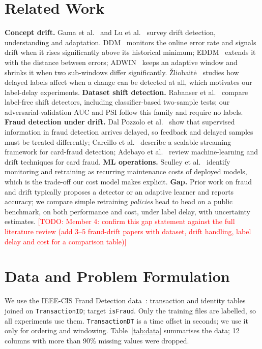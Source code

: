 \documentclass[conference]{IEEEtran}
\newcommand{\todo}[1]{\textcolor{red}{[TODO: #1]}}
\begin{document}
\section{Related Work}
\textbf{Concept drift.} Gama et al.~\cite{gama2014survey} and Lu et al.~\cite{lu2019review} survey drift detection, understanding and adaptation.
DDM~\cite{gama2004ddm} monitors the online error rate and signals drift when it rises significantly above its historical minimum;
EDDM~\cite{baena2006eddm} extends it with the distance between errors; ADWIN~\cite{bifet2007adwin} keeps an adaptive window and
shrinks it when two sub-windows differ significantly. \v{Z}liobait\.{e}~\cite{zliobaite2010delayed} studies how delayed labels affect
when a change can be detected at all, which motivates our label-delay experiments.
\textbf{Dataset shift detection.} Rabanser et al.~\cite{rabanser2019failing} compare label-free shift detectors, including classifier-based
two-sample tests; our adversarial-validation AUC and PSI follow this family and require no labels.
\textbf{Fraud detection under drift.} Dal Pozzolo et al.~\cite{dalpozzolo2018} show that supervised information in fraud detection arrives
delayed, so feedback and delayed samples must be treated differently; Carcillo et al.~\cite{carcillo2018scarff} describe a scalable streaming framework for
card-fraud detection; Adebayo et al.~\cite{adebayo2023} review machine-learning and drift techniques for card fraud.
\textbf{ML operations.} Sculley et al.~\cite{sculley2015debt} identify monitoring and retraining as recurring maintenance costs of deployed
models, which is the trade-off our cost model makes explicit.
\textbf{Gap.} Prior work on fraud and drift typically proposes a detector or an adaptive learner and reports accuracy; we compare simple retraining
\emph{policies} head to head on a public benchmark, on both performance and cost, under label delay, with uncertainty estimates.
\todo{Member 4: confirm this gap statement against the full literature review (add 3--5 fraud-drift papers with dataset, drift handling, label delay and cost for a comparison table)}

\section{Data and Problem Formulation}
We use the IEEE-CIS Fraud Detection data~\cite{ieeecis}: transaction and identity tables joined on \texttt{TransactionID}; target
\texttt{isFraud}. Only the training files are labelled, so all experiments use them. \texttt{TransactionDT} is a time offset in seconds;
we use it only for ordering and windowing. Table~\ref{tab:data} summarises the data; 12 columns with more than 90\% missing values were dropped.
\end{document}
